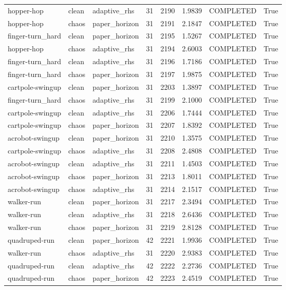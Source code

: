 \begin{tabular}{llllllll}
hopper-hop & clean & adaptive\_rhs & 31 & 2190 & 1.9839 & COMPLETED & True \\
hopper-hop & chaos & paper\_horizon & 31 & 2191 & 2.1847 & COMPLETED & True \\
finger-turn\_hard & clean & paper\_horizon & 31 & 2195 & 1.5267 & COMPLETED & True \\
hopper-hop & chaos & adaptive\_rhs & 31 & 2194 & 2.6003 & COMPLETED & True \\
finger-turn\_hard & clean & adaptive\_rhs & 31 & 2196 & 1.7186 & COMPLETED & True \\
finger-turn\_hard & chaos & paper\_horizon & 31 & 2197 & 1.9875 & COMPLETED & True \\
cartpole-swingup & clean & paper\_horizon & 31 & 2203 & 1.3897 & COMPLETED & True \\
finger-turn\_hard & chaos & adaptive\_rhs & 31 & 2199 & 2.1000 & COMPLETED & True \\
cartpole-swingup & clean & adaptive\_rhs & 31 & 2206 & 1.7444 & COMPLETED & True \\
cartpole-swingup & chaos & paper\_horizon & 31 & 2207 & 1.8392 & COMPLETED & True \\
acrobot-swingup & clean & paper\_horizon & 31 & 2210 & 1.3575 & COMPLETED & True \\
cartpole-swingup & chaos & adaptive\_rhs & 31 & 2208 & 2.4808 & COMPLETED & True \\
acrobot-swingup & clean & adaptive\_rhs & 31 & 2211 & 1.4503 & COMPLETED & True \\
acrobot-swingup & chaos & paper\_horizon & 31 & 2213 & 1.8011 & COMPLETED & True \\
acrobot-swingup & chaos & adaptive\_rhs & 31 & 2214 & 2.1517 & COMPLETED & True \\
walker-run & clean & paper\_horizon & 31 & 2217 & 2.3494 & COMPLETED & True \\
walker-run & clean & adaptive\_rhs & 31 & 2218 & 2.6436 & COMPLETED & True \\
walker-run & chaos & paper\_horizon & 31 & 2219 & 2.8128 & COMPLETED & True \\
quadruped-run & clean & paper\_horizon & 42 & 2221 & 1.9936 & COMPLETED & True \\
walker-run & chaos & adaptive\_rhs & 31 & 2220 & 2.9383 & COMPLETED & True \\
quadruped-run & clean & adaptive\_rhs & 42 & 2222 & 2.2736 & COMPLETED & True \\
quadruped-run & chaos & paper\_horizon & 42 & 2223 & 2.4519 & COMPLETED & True \\

\end{tabular}
